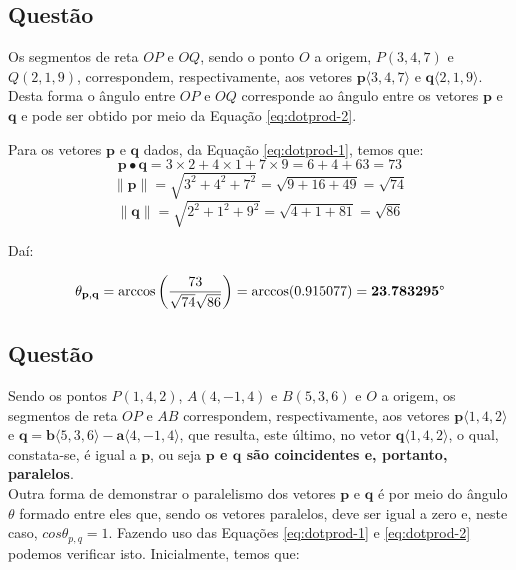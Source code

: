 \documentclass[a4paper,11pt,pagenumber=true]{article}
\newcommand{\vecp}{$\mathbf{p}$}
\newcommand{\vecq}{$\mathbf{q}$}
\newcommand{\vecnorm}[1]{\|\mathbf{#1}\|}
\newcommand{\dotprod}[2]{\mathbf{#1} \bullet \mathbf{#2}}
\theoremstyle{mytheor}
\begin{document}
        \subsection{Questão }
        
            Os segmentos de reta $OP$ e $OQ$, sendo o ponto $O$ a origem, $P(3, 4, 7)$ e $Q(2, 1, 9)$,
            correspondem, respectivamente, aos vetores 
            $\mathbf{p}\langle 3, 4, 7 \rangle$ e $\mathbf{q} \langle 2, 1, 9 \rangle$.
            Desta forma o ângulo entre $OP$ e $OQ$ corresponde ao ângulo entre os vetores 
            \vecp{} e \vecq{} e pode ser obtido por meio da Equação \ref{eq:dotprod-2}. 
            
            Para os vetores \vecp{} e \vecq{} dados, da Equação \ref{eq:dotprod-1}, temos que:
            \[\dotprod{p}{q} = 3 \times 2 + 4 \times 1 + 7 \times 9 = 6 + 4 + 63 = 73\]
            \[\vecnorm{p} = \sqrt{3^2 + 4^2 + 7^2} = \sqrt{9 + 16 + 49} = \sqrt{74}\]
            \[\vecnorm{q} = \sqrt{2^2 + 1^2 + 9^2} = \sqrt{4 + 1 + 81} = \sqrt{86}\]
            
            Daí:
            
            \[
                \theta_{\mathbf{p},\mathbf{q}} = \arccos \left(\frac{73}{\sqrt{74}\sqrt{86}}\right) =
                \arccos(0.915077) = \mathbf{23.783295\degree}
            \]
        
        \subsection{Questão }
        
            Sendo os pontos $P(1, 4, 2)$, $A(4, -1, 4)$ e $B(5, 3, 6)$ e $O$ a origem, os segmentos de reta
            $OP$ e $AB$ correspondem, respectivamente, aos vetores $\mathbf{p} \langle 1, 4, 2 \rangle$ e
            $\mathbf{q} = \mathbf{b} \langle 5, 3, 6 \rangle - \mathbf{a} \langle 4, -1, 4 \rangle$, que 
            resulta, este último, no vetor $\mathbf{q} \langle 1, 4, 2 \rangle$, o qual, constata-se, é
            igual a \vecp, ou seja \textbf{\vecp{} e \vecq{} são coincidentes e, portanto, paralelos}. \\
            
            Outra forma de demonstrar o paralelismo dos vetores \vecp{} e \vecq{} é por meio do ângulo $\theta$ formado entre eles que, sendo os vetores paralelos, deve ser igual a zero e, neste caso, $cos \theta_{p,q} = 1$. Fazendo uso das Equações \ref{eq:dotprod-1} e \ref{eq:dotprod-2} podemos verificar isto. Inicialmente, temos que: 
            
\end{document}
